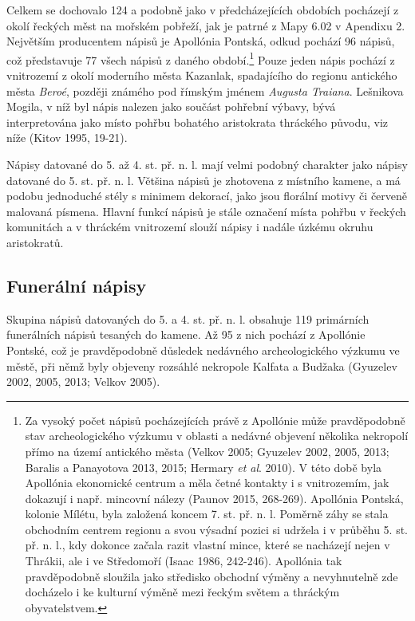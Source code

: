 \NC\AR
\HL
\HL
\stoptable

Celkem se dochovalo 124 a podobně jako v předcházejících obdobích pocházejí z okolí řeckých měst na mořském pobřeží, jak je patrné z Mapy 6.02 v Apendixu 2. Největším producentem nápisů je Apollónia Pontská, odkud pochází 96 nápisů, což představuje 77  všech nápisů z daného období.\footnote{Za vysoký počet nápisů pocházejících právě z Apollónie může pravděpodobně stav archeologického výzkumu v oblasti a nedávné objevení několika nekropolí přímo na území antického města (Velkov 2005; Gyuzelev 2002, 2005, 2013; Baralis a Panayotova 2013, 2015; Hermary {\em et al}. 2010). V této době byla Apollónia ekonomické centrum a měla četné kontakty i s vnitrozemím, jak dokazují i např. mincovní nálezy (Paunov 2015, 268-269). Apollónia Pontská, kolonie Mílétu, byla založená koncem 7. st. př. n. l. Poměrně záhy se stala obchodním centrem regionu a svou výsadní pozici si udržela i v průběhu 5. st. př. n. l., kdy dokonce začala razit vlastní mince, které se nacházejí nejen v Thrákii, ale i ve Středomoří (Isaac 1986, 242-246). Apollónia tak pravděpodobně sloužila jako středisko obchodní výměny a nevyhnutelně zde docházelo i ke kulturní výměně mezi řeckým světem a thráckým obyvatelstvem.} Pouze jeden nápis pochází z vnitrozemí z okolí moderního města Kazanlak, spadajícího do regionu antického města {\em Beroé}, později známého pod římským jménem {\em Augusta Traiana}. Lešnikova Mogila, v níž byl nápis nalezen jako součást pohřební výbavy, bývá interpretována jako místo pohřbu bohatého aristokrata thráckého původu, viz níže (Kitov 1995, 19-21).

Nápisy datované do 5. až 4. st. př. n. l. mají velmi podobný charakter jako nápisy datované do 5. st. př. n. l. Většina nápisů je zhotovena z místního kamene, a má podobu jednoduché stély s minimem dekorací, jako jsou florální motivy či červeně malovaná písmena. Hlavní funkcí nápisů je stále označení místa pohřbu v řeckých komunitách a v thráckém vnitrozemí slouží nápisy i nadále úzkému okruhu aristokratů.

\subsection[funerální-nápisy-2]{Funerální nápisy}

Skupina nápisů datovaných do 5. a 4. st. př. n. l. obsahuje 119 primárních funerálních nápisů tesaných do kamene. Až 95 z nich pochází z Apollónie Pontské, což je pravděpodobně důsledek nedávného archeologického výzkumu ve městě, při němž byly objeveny rozsáhlé nekropole Kalfata a Budžaka (Gyuzelev 2002, 2005, 2013; Velkov 2005).

